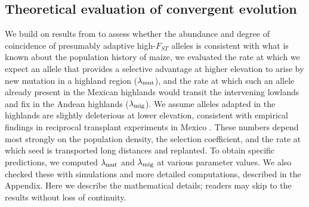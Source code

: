 \subsection*{Theoretical evaluation of convergent evolution }
We build on results from \cite[]{ralph2014convergent} to assess whether the abundance and degree of coincidence of presumably adaptive high-$F_{ST}$ alleles is consistent with what is known about the population history of maize, we evaluated the rate at which we expect an allele that provides a selective advantage at higher elevation to arise by new mutation in a highland region ($\lambda_{\text{mut}}$), and the rate at which such an allele already present in the Mexican highlands would transit the intervening lowlands and fix in the Andean highlands ($\lambda_{\text{mig}}$).
We assume alleles adapted in the highlands are slightly deleterious at lower elevation, consistent with empirical findings in reciprocal transplant experiments in Mexico \cite[]{Mercer2008}.
These numbers depend most strongly on the population density, the selection coefficient, and the rate at which seed is transported long distances and replanted.
To obtain specific predictions, we computed $\lambda_{\text{mut}}$ and $\lambda_{\text{mig}}$ at various parameter values.
We also checked these with simulations and more detailed computations, described in the Appendix.
Here we describe the mathematical details; readers may skip to the results without loss of continuity.\\

